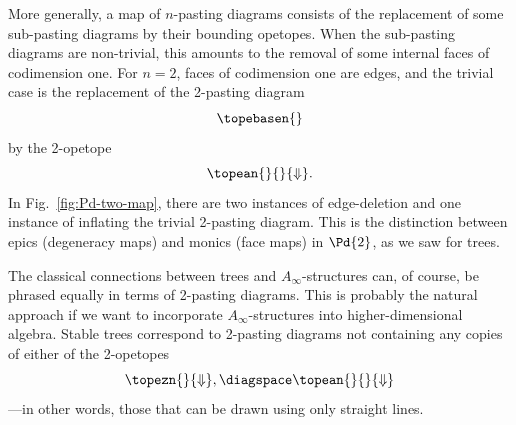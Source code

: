 More generally, a map of $n$-pasting diagrams consists of the replacement
of some sub-pasting diagrams by their bounding opetopes.  When the
sub-pasting diagrams are non-trivial, this amounts to the removal of some
internal faces of codimension one.  For $n=2$, faces of codimension one are
edges, and the trivial case is the replacement of the 2-pasting diagram
\[
\topebasen{}
\]
by the 2-opetope
\[
\topean{}{}{\Downarrow}
.
\]
In Fig.~\ref{fig:Pd-two-map}, there are two instances of edge-deletion and
one instance of inflating the trivial 2-pasting diagram.  This is the
distinction between epics%
%
%
%
%
(degeneracy%
%
%
maps) and monics%
%
%
%
%
(face%
%
%
maps) in
$\Pd{2}$, as we saw for trees.

The classical connections between trees and $A_\infty$-structures%
%
%
%
%
%
%
can, of
course, be phrased equally in terms of 2-pasting diagrams.  This is
probably the natural approach if we want to incorporate
$A_\infty$-structures into higher-dimensional algebra.  Stable%
%
%
trees
correspond to 2-pasting diagrams not containing any copies of either of the
2-opetopes
\[
\topezn{}{\Downarrow},
\diagspace
\topean{}{}{\Downarrow}
\]
---in other words, those that can be drawn using only straight lines.

